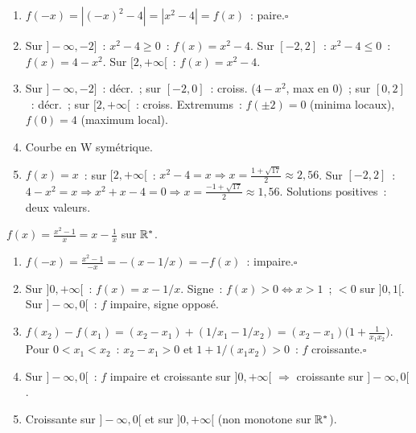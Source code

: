 
\begin{enumerate}
  \item $f(-x)=|(-x)^2-4|=|x^2-4|=f(x)$~: paire.\hfill$\square$
  \item Sur $]-\infty,-2]$~: $x^2-4\geq0$~: $f(x)=x^2-4$.
        Sur $[-2,2]$~: $x^2-4\leq0$~: $f(x)=4-x^2$.
        Sur $[2,+\infty[$~: $f(x)=x^2-4$.
  \item Sur $]-\infty,-2]$~: d\'ecr.~; sur $[-2,0]$~: croiss. ($4-x^2$, max en $0$)~;
        sur $[0,2]$~: d\'ecr.~; sur $[2,+\infty[$~: croiss.
        Extremums~: $f(\pm2)=0$ (minima locaux), $f(0)=4$ (maximum local).
  \item Courbe en W sym\'etrique.
  \item $f(x)=x$~: sur $[2,+\infty[$~: $x^2-4=x\Rightarrow x=\frac{1+\sqrt{17}}{2}\approx2{,}56$.\checkmark
        Sur $[-2,2]$~: $4-x^2=x\Rightarrow x^2+x-4=0\Rightarrow x=\frac{-1+\sqrt{17}}{2}\approx1{,}56$.
        Solutions positives~: deux valeurs.
\end{enumerate}


$f(x)=\frac{x^2-1}{x}=x-\frac{1}{x}$ sur $\mathbb{R}^*$.
\begin{enumerate}
  \item $f(-x)=\frac{x^2-1}{-x}=-(x-1/x)=-f(x)$~: impaire.\hfill$\square$
  \item Sur $]0,+\infty[$~: $f(x)=x-1/x$. Signe~: $f(x)>0\Leftrightarrow x>1$~; $<0$ sur $]0,1[$.
        Sur $]-\infty,0[$~: $f$ impaire, signe oppos\'e.
  \item $f(x_2)-f(x_1)=(x_2-x_1)+(1/x_1-1/x_2)=(x_2-x_1)\bigl(1+\frac{1}{x_1x_2}\bigr)$.
        Pour $0<x_1<x_2$~: $x_2-x_1>0$ et $1+1/(x_1x_2)>0$~: $f$ croissante.\hfill$\square$
  \item Sur $]-\infty,0[$~: $f$ impaire et croissante sur $]0,+\infty[$ $\Rightarrow$ croissante sur $]-\infty,0[$.
  \item Croissante sur $]-\infty,0[$ et sur $]0,+\infty[$ (non monotone sur $\mathbb{R}^*$).
\end{enumerate}


